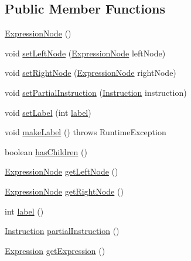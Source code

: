 \subsection*{Public Member Functions}
\begin{DoxyCompactItemize}
\item 
\hyperlink{classcas_1_1parser_1_1parser__containers_1_1_expression_node_a6aaea753a98084e9b22255ce53c31771}{Expression\-Node} ()
\item 
void \hyperlink{classcas_1_1parser_1_1parser__containers_1_1_expression_node_af37f6d1bdba8fe13b2dc9fd66d0b7414}{set\-Left\-Node} (\hyperlink{classcas_1_1parser_1_1parser__containers_1_1_expression_node}{Expression\-Node} left\-Node)
\item 
void \hyperlink{classcas_1_1parser_1_1parser__containers_1_1_expression_node_a4ccd425a9a5143f4724628185ef6070a}{set\-Right\-Node} (\hyperlink{classcas_1_1parser_1_1parser__containers_1_1_expression_node}{Expression\-Node} right\-Node)
\item 
void \hyperlink{classcas_1_1parser_1_1parser__containers_1_1_expression_node_ae873ca67bc4f88fe7f4113271bd18fee}{set\-Partial\-Instruction} (\hyperlink{classcas_1_1instruction_1_1_instruction}{Instruction} instruction)
\item 
void \hyperlink{classcas_1_1parser_1_1parser__containers_1_1_expression_node_aad8d8730a9e7c4184cc9ba4750e14ed9}{set\-Label} (int \hyperlink{classcas_1_1parser_1_1parser__containers_1_1_expression_node_ab6d6903b314dfd5b4b79ccbce24f0631}{label})
\item 
void \hyperlink{classcas_1_1parser_1_1parser__containers_1_1_expression_node_af7249a7d98cf1836aa91de98050c2854}{make\-Label} ()  throws Runtime\-Exception 
\item 
boolean \hyperlink{classcas_1_1parser_1_1parser__containers_1_1_expression_node_a0fbc1d0a05bbe68a8827be9bf35ee617}{has\-Children} ()
\item 
\hyperlink{classcas_1_1parser_1_1parser__containers_1_1_expression_node}{Expression\-Node} \hyperlink{classcas_1_1parser_1_1parser__containers_1_1_expression_node_a78b33b4902212c64b11f1efb1f9f39b8}{get\-Left\-Node} ()
\item 
\hyperlink{classcas_1_1parser_1_1parser__containers_1_1_expression_node}{Expression\-Node} \hyperlink{classcas_1_1parser_1_1parser__containers_1_1_expression_node_a04ed4ef18d9bcaedf8512577657fc856}{get\-Right\-Node} ()
\item 
int \hyperlink{classcas_1_1parser_1_1parser__containers_1_1_expression_node_adf3d73f73c910850ec7c2a0696d78503}{label} ()
\item 
\hyperlink{classcas_1_1instruction_1_1_instruction}{Instruction} \hyperlink{classcas_1_1parser_1_1parser__containers_1_1_expression_node_abe26368226d31ccbc5efdd17f3ae14d4}{partial\-Instruction} ()
\item 
\hyperlink{classcas_1_1parser_1_1parser__containers_1_1_expression}{Expression} \hyperlink{classcas_1_1parser_1_1parser__containers_1_1_expression_node_a76aa3de99fba3760b753a903b639ace1}{get\-Expression} ()
\end{DoxyCompactItemize}
